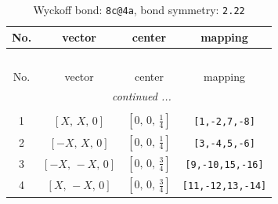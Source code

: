 \documentclass[fleqn,8pt]{jsarticle}
\begin{document}
\renewcommand{\arraystretch}{1.2}
\begin{longtable}{cccc}
\caption{Wyckoff bond: {\tt 8c@4a}, bond symmetry: {\tt 2.22}}
 \\
 \hline \hline
No. & vector & center & mapping \\ \hline \endfirsthead

\multicolumn{3}{l}{\tablename\ \thetable{}} \\
 \hline \hline
No. & vector & center & mapping \\ \hline \endhead

 \hline \hline
\multicolumn{3}{r}{\footnotesize\it continued ...} \\ \endfoot

 \hline \hline
\multicolumn{3}{r}{} \\ \endlastfoot

1 & $\left[ X,\, X,\, 0 \right]$ & $\left[ 0,\, 0,\, \frac{1}{4} \right]$ & {\tt [1,-2,7,-8]} \\ \hline
2 & $\left[ - X,\, X,\, 0 \right]$ & $\left[ 0,\, 0,\, \frac{1}{4} \right]$ & {\tt [3,-4,5,-6]} \\ \hline
3 & $\left[ - X,\, - X,\, 0 \right]$ & $\left[ 0,\, 0,\, \frac{3}{4} \right]$ & {\tt [9,-10,15,-16]} \\ \hline
4 & $\left[ X,\, - X,\, 0 \right]$ & $\left[ 0,\, 0,\, \frac{3}{4} \right]$ & {\tt [11,-12,13,-14]} \\
\end{longtable}
\renewcommand{\arraystretch}{1.2}
\end{document}
